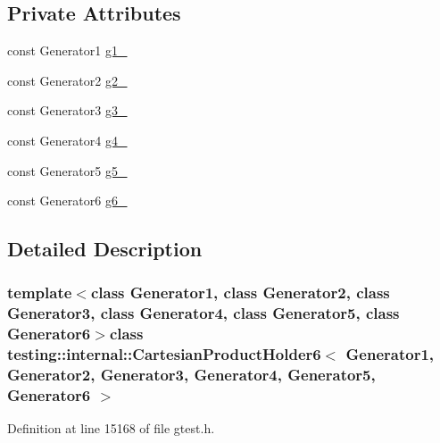\subsection*{\-Private \-Attributes}
\begin{DoxyCompactItemize}
\item 
const \-Generator1 \hyperlink{classtesting_1_1internal_1_1CartesianProductHolder6_a36a04c8f9e515291d6a093ab378084f7}{g1\-\_\-}
\item 
const \-Generator2 \hyperlink{classtesting_1_1internal_1_1CartesianProductHolder6_a6cfd9fa9a396d07747d5ebb1f05c7f22}{g2\-\_\-}
\item 
const \-Generator3 \hyperlink{classtesting_1_1internal_1_1CartesianProductHolder6_a79088ad1a5d8e0e316bd20057b9cfb3f}{g3\-\_\-}
\item 
const \-Generator4 \hyperlink{classtesting_1_1internal_1_1CartesianProductHolder6_afdb77af6126bc058715b1304ec0cc727}{g4\-\_\-}
\item 
const \-Generator5 \hyperlink{classtesting_1_1internal_1_1CartesianProductHolder6_ac153ca256cc6aabca132e9276e0b7e80}{g5\-\_\-}
\item 
const \-Generator6 \hyperlink{classtesting_1_1internal_1_1CartesianProductHolder6_ac5367ac6ea4b99933483d6181bace5c2}{g6\-\_\-}
\end{DoxyCompactItemize}


\subsection{\-Detailed \-Description}
\subsubsection*{template$<$class Generator1, class Generator2, class Generator3, class Generator4, class Generator5, class Generator6$>$class testing\-::internal\-::\-Cartesian\-Product\-Holder6$<$ Generator1, Generator2, Generator3, Generator4, Generator5, Generator6 $>$}



\-Definition at line 15168 of file gtest.\-h.



